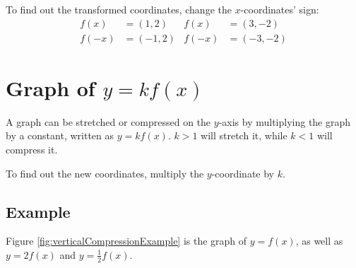 To find out the transformed coordinates, change the $x$-coordinates' sign:
\begin{align*}
	f(x)&=(1,2) & f(x)&=(3,-2)\\
	f(-x)&=(-1,2) & f(-x)&=(-3,-2)
\end{align*}


\section{Graph of $y=kf(x)$}
A graph can be stretched or compressed on the $y$-axis by multiplying the graph by a constant, written as $y=kf(x)$. $k>1$ will stretch it, while $k<1$ will compress it.

To find out the new coordinates, multiply the $y$-coordinate by $k$.

\subsection{Example}
Figure \ref{fig:verticalCompressionExample} is the graph of $y=f(x)$, as well as $y=2f(x)$ and $y=\frac{1}{2}f(x)$.

